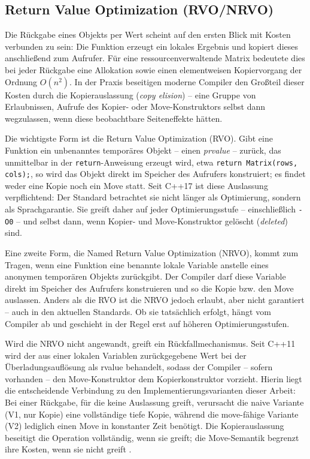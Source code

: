 \documentclass[10pt,a4paper]{article}
\begin{document}
\subsection{Return Value Optimization (RVO/NRVO)}

Die Rückgabe eines Objekts per Wert scheint auf den ersten Blick mit
Kosten verbunden zu sein: Die Funktion erzeugt ein lokales Ergebnis und
kopiert dieses anschließend zum Aufrufer. Für eine
ressourcenverwaltende Matrix bedeutete dies bei jeder Rückgabe eine
Allokation sowie einen elementweisen Kopiervorgang der Ordnung
\(O(n^2)\). In der Praxis beseitigen moderne Compiler den Großteil
dieser Kosten durch die Kopierauslassung (\emph{copy elision}) -- eine
Gruppe von Erlaubnissen, Aufrufe des Kopier- oder Move-Konstruktors
selbst dann wegzulassen, wenn diese beobachtbare Seiteneffekte hätten.

Die wichtigste Form ist die Return Value Optimization (RVO). Gibt eine
Funktion ein unbenanntes temporäres Objekt -- einen \emph{prvalue} --
zurück, das unmittelbar in der \texttt{return}-Anweisung erzeugt wird,
etwa \texttt{return Matrix(rows, cols);}, so wird das Objekt direkt im
Speicher des Aufrufers konstruiert; es findet weder eine Kopie noch ein
Move statt. Seit C++17 ist diese Auslassung verpflichtend: Der Standard
betrachtet sie nicht länger als Optimierung, sondern als
Sprachgarantie. Sie greift daher auf jeder Optimierungsstufe --
einschließlich \texttt{-O0} -- und selbst dann, wenn Kopier- und
Move-Konstruktor gelöscht (\emph{deleted}) sind.

Eine zweite Form, die Named Return Value Optimization (NRVO), kommt zum
Tragen, wenn eine Funktion eine benannte lokale Variable anstelle eines
anonymen temporären Objekts zurückgibt. Der Compiler darf diese
Variable direkt im Speicher des Aufrufers konstruieren und so die Kopie
bzw. den Move auslassen. Anders als die RVO ist die NRVO jedoch
erlaubt, aber nicht garantiert -- auch in den aktuellen Standards. Ob
sie tatsächlich erfolgt, hängt vom Compiler ab und geschieht in der
Regel erst auf höheren Optimierungsstufen.

Wird die NRVO nicht angewandt, greift ein Rückfallmechanismus. Seit
C++11 wird der aus einer lokalen Variablen zurückgegebene Wert bei der
Überladungsauflösung als rvalue behandelt, sodass der Compiler -- sofern
vorhanden -- den Move-Konstruktor dem Kopierkonstruktor vorzieht.
Hierin liegt die entscheidende Verbindung zu den
Implementierungsvarianten dieser Arbeit: Bei einer Rückgabe, für die
keine Auslassung greift, verursacht die naive Variante (V1, nur Kopie)
eine vollständige tiefe Kopie, während die move-fähige Variante (V2)
lediglich einen Move in konstanter Zeit benötigt. Die Kopierauslassung
beseitigt die Operation vollständig, wenn sie greift; die Move-Semantik
begrenzt ihre Kosten, wenn sie nicht greift \cite{cppreference_elision,meyers2014}.
\end{document}
